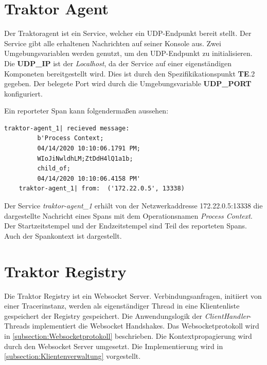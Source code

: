\section{Traktor Agent}
\label{section:Traktor Agent}

Der Traktoragent ist ein Service, welcher ein UDP-Endpunkt bereit stellt. Der Service gibt alle erhaltenen Nachrichten auf seiner Konsole aus. Zwei Umgebungsvariablen werden genutzt, um den UDP-Endpunkt zu initialisieren. Die \textbf{UDP\_IP} ist der \emph{Localhost}, da der Service auf einer eigenständigen Komponeten bereitgestellt wird. Dies ist durch den Spezifikikationspunkt \textbf{TE}.2  gegeben. Der belegete Port wird durch die Umgebungsvariable \textbf{UDP\_PORT} konfiguriert. 

Ein reporteter Span kann folgendermaßen aussehen:

\begin{minipage}[]{\textwidth}
	\begin{lstlisting}[frame=trBL]
	traktor-agent_1| recieved message: 
		 b'Process Context;
		 04/14/2020 10:10:06.1791 PM;
		 WIoJiNwldhLM;ZtDdH4lQ1a1b;
		 child_of;
		 04/14/2020 10:10:06.4158 PM'
	traktor-agent_1| from:  ('172.22.0.5', 13338)
	\end{lstlisting}
	\label{listing:Reporteter-Span}
\end{minipage} 

Der Service \emph{traktor-agent\_1} erhält von der Netzwerkaddresse 172.22.0.5:13338 die dargestellte Nachricht eines Spans mit dem Operationsnamen \emph{Process Context}. Der Startzeitstempel und der Endzeitstempel sind Teil des reporteten Spans. Auch der Spankontext ist dargestellt.

\section{Traktor Registry}
\label{section:Traktor Registry}

Die Traktor Registry ist ein Websocket Server. Verbindungsanfragen, initiiert von einer Tracerinstanz, werden als eigenständiger Thread in eine Klientenliste gespeichert der Registry gespeichert. Die Anwendungslogik der \emph{ClientHandler}-Threads implementiert die Websocket Handshakes. Das Websocketprotokoll wird in \cref{subsection:Websocketprotokoll} beschrieben. Die Kontextpropagierung wird durch den Websocket Server umgesetzt. Die Implementierung wird in \cref{subsection:Klientenverwaltung} vorgestellt.

